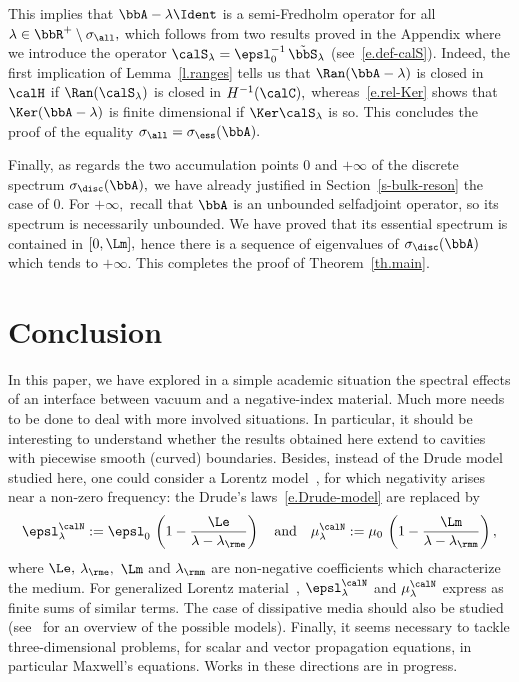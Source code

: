 This implies that $\bbA - \lambda \Ident$ is a semi-Fredholm operator for all $\lambda \in \bbR^{+}\setminus\sigma_{\all},$ which follows from two results proved in the Appendix where we introduce the operator $\calS_\lambda = \epsl_0^{-1}\,\tilde\bbS_\lambda$ (see~\eqref{e.def-calS}). Indeed, the first implication of Lemma~\ref{l.ranges} tells us that $\Ran(\bbA - \lambda)$ is closed in $\calH$ if $\Ran(\calS_\lambda)$ is closed in $H^{-1}(\calC),$ whereas~\eqref{e.rel-Ker} shows that $\Ker(\bbA-\lambda)$ is finite dimensional if $\Ker\calS_\lambda$ is so. This concludes the proof of the equality $\sigma_{\all} = \sigma_{\ess}(\bbA).$

Finally, as regards the two accumulation points $0$ and $+\infty$ of the discrete spectrum $\sigma_{\disc}(\bbA),$ we have already justified in Section~\ref{s-bulk-reson} the case of $0$. For $+\infty,$ recall that $\bbA$ is an unbounded selfadjoint operator, so its spectrum is necessarily unbounded. We have proved that its essential spectrum is contained in $[0, \Lm],$ hence there is a sequence of eigenvalues of $\sigma_{\disc}(\bbA)$ which tends to $+\infty.$ This completes the proof of Theorem~\ref{th.main}.

\section{Conclusion}
In this paper, we have explored in a simple academic situation the spectral effects of an interface between vacuum and a negative-index material. Much more needs to be done to deal with more involved situations. In particular, it should be interesting to understand whether the results obtained here extend to cavities with piecewise smooth (curved) boundaries. Besides, instead of the Drude model studied here, one could consider a Lorentz model~\cite{Gra-May-12,Gra-Tip-10}, for which negativity arises near a non-zero frequency: the Drude's laws~\eqref{e.Drude-model} are replaced by
\[
\epsl^\calN_\lambda := \epsl_0\, \left(1 - \frac{\Le}{\lambda-\lambda_{\rme}} \right)
\quad\text{and}\quad
\mu^\calN_\lambda := \mu_0\, \left(1 - \frac{\Lm}{\lambda-\lambda_{\rmm}} \right),
\]
where $\Le,$ $\lambda_{\rme},$ $\Lm$ and $\lambda_{\rmm}$ are non-negative coefficients which characterize the medium. For generalized Lorentz material~\cite{Tip-04}, $\epsl^\calN_\lambda$ and $\mu^\calN_\lambda$ express as finite sums of similar terms. The case of dissipative media should also be studied (see~\cite{Cas-Jol-Kac} for an overview of the possible models). Finally, it seems necessary to tackle three-dimensional problems, for scalar and vector propagation equations, in particular Maxwell's equations. Works in these directions are in progress.

